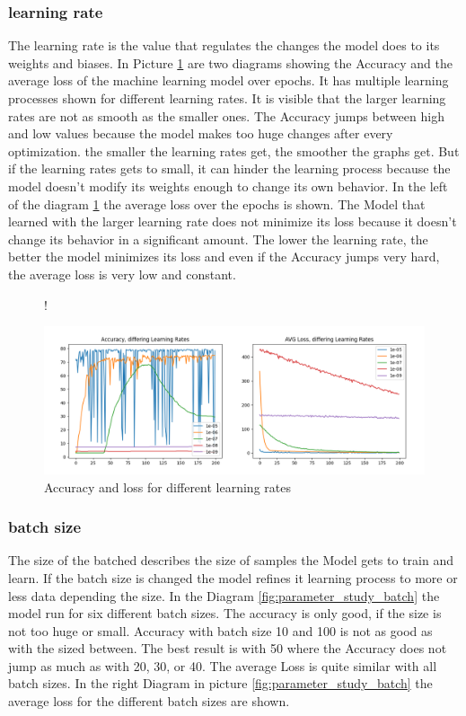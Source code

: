 \documentclass[a4paper, 12pt, oneside]{scrbook}
\begin{document}
				\subsubsection{learning rate}
					The learning rate is the value that regulates the changes the model does to its weights and biases. In Picture \ref{fig:parameter_study_learning} are two diagrams showing the Accuracy and the average loss of the machine learning model over epochs. It has multiple learning processes shown for different learning rates. It is visible that the larger learning rates are not as smooth as the smaller ones. The Accuracy jumps between high and low values because the model makes too huge changes after every optimization. the smaller the learning rates get, the smoother the graphs get. But if the learning rates gets to small, it can hinder the learning process because the model doesn't modify its weights enough to change its own behavior. In the left of the diagram \ref{fig:parameter_study_learning} the average loss over the epochs is shown. The Model that learned with the larger learning rate does not minimize its loss because it doesn't change its behavior in a significant amount. The lower the learning rate, the better the model minimizes its loss and even if the Accuracy jumps very hard, the average loss is very low and constant.
					
					\begin{figure} [H]
						\centering
						\resizebox{\linewidth} {!} {
							\includegraphics{res/parameter_study/learning_ps.png}
							
						}
						\caption{Accuracy and loss for different learning rates}
						\label{fig:parameter_study_learning}
					\end{figure}
					
				\subsubsection{batch size}
					\noindent The size of the batched describes the size of samples the Model gets to train and learn. If the batch size is changed the model refines it learning process to more or less data depending the size. In the Diagram \ref{fig:parameter_study_batch} the model run for six different batch sizes. The accuracy is only good, if the size is not too huge or small. Accuracy with batch size 10 and 100 is not as good as with the sized between. The best result is with 50 where the Accuracy does not jump as much as with 20, 30, or 40. The average Loss is quite similar with all batch sizes. In the right Diagram in picture \ref{fig:parameter_study_batch} the average loss for the different batch sizes are shown. 
					
\end{document}
